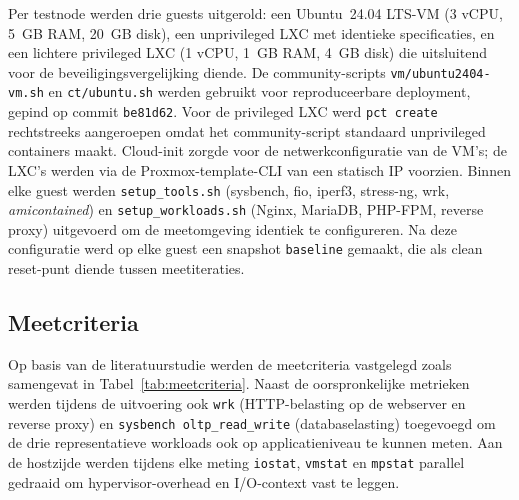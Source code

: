 Per testnode werden drie guests uitgerold: een Ubuntu~24.04 LTS-VM (3 vCPU, 5~GB RAM, 20~GB disk), een unprivileged LXC met identieke specificaties, en een lichtere privileged LXC (1 vCPU, 1~GB RAM, 4~GB disk) die uitsluitend voor de beveiligingsvergelijking diende. De community-scripts \texttt{vm/ubuntu2404-vm.sh} en \texttt{ct/ubuntu.sh} werden gebruikt voor reproduceerbare deployment, gepind op commit \texttt{be81d62}. Voor de privileged LXC werd \texttt{pct create} rechtstreeks aangeroepen omdat het community-script standaard unprivileged containers maakt. Cloud-init zorgde voor de netwerkconfiguratie van de VM's; de LXC's werden via de Proxmox-template-CLI van een statisch IP voorzien. Binnen elke guest werden \texttt{setup\_tools.sh} (sysbench, fio, iperf3, stress-ng, wrk, \textit{amicontained}) en \texttt{setup\_workloads.sh} (Nginx, MariaDB, PHP-FPM, reverse proxy) uitgevoerd om de meetomgeving identiek te configureren. Na deze configuratie werd op elke guest een snapshot \texttt{baseline} gemaakt, die als clean reset-punt diende tussen meetiteraties.

\subsection{Meetcriteria}
Op basis van de literatuurstudie werden de meetcriteria vastgelegd zoals samengevat in Tabel~\ref{tab:meetcriteria}. Naast de oorspronkelijke metrieken werden tijdens de uitvoering ook \texttt{wrk} (HTTP-belasting op de webserver en reverse proxy) en \texttt{sysbench oltp\_read\_write} (databaselasting) toegevoegd om de drie representatieve workloads ook op applicatieniveau te kunnen meten. Aan de hostzijde werden tijdens elke meting \texttt{iostat}, \texttt{vmstat} en \texttt{mpstat} parallel gedraaid om hypervisor-overhead en I/O-context vast te leggen.

